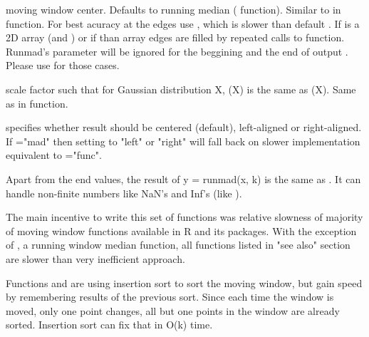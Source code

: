 \begin{Arguments}
\begin{ldescription}
\item[\code{center}] moving window center. Defaults 
to running median ( function). Similar to   
in  function. For best acuracy at the edges use 
, which is slower than default
. If  is a 2D array (and 
) or if  than array edges are 
filled by repeated calls to 
 function. 
Runmad's  parameter will be ignored for the beggining and the 
end of output .  Please use  
 for those cases.  

\item[\code{constant}] scale factor such that for Gaussian 
distribution X, (X) is the same as (X). 
Same as  in  function.
\item[\code{align}] specifies whether result should be centered (default), 
left-aligned or right-aligned.  If ="mad" then setting
 to "left" or "right" will fall back on slower implementation 
equivalent to ="func". 
\end{ldescription}
\end{Arguments}
\begin{Details}\relax
Apart from the end values, the result of y = runmad(x, k) is the same as 
. 
It can handle non-finite numbers like NaN's and Inf's 
(like ).

The main incentive to write this set of functions was relative slowness of 
majority of moving window functions available in R and its packages.  With the 
exception of , a running window median function, all 
functions listed in "see also" section are slower than very inefficient 
 approach. 

Functions  and  are using insertion sort to 
sort the moving window, but gain speed by remembering results of the previous 
sort. Since each time the window is moved, only one point changes, all but one 
points in the window are already sorted. Insertion sort can fix that in O(k) 
time.
\end{Details}
